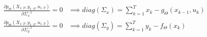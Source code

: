 \documentclass[10pt,a4paper]{report}
\begin{document}
\begin{align*}
    \frac{\partial p_{\Theta}(X_{1:T}, y_{1:T}, u_{1:T})}{\partial \Sigma_x^{-1}} = 0 & \implies diag(\Sigma_x) = \sum_{k=1}^T x_k - g_{\Theta}(x_{k-1}, u_k) \\
    \frac{\partial p_{\Theta}(X_{1:T}, y_{1:T}, u_{1:T})}{\partial \Sigma_y^{-1}} = 0 & \implies diag(\Sigma_y) = \sum_{k=1}^T y_k - f_{\Theta}(x_k)
\end{align*}
\end{document}
